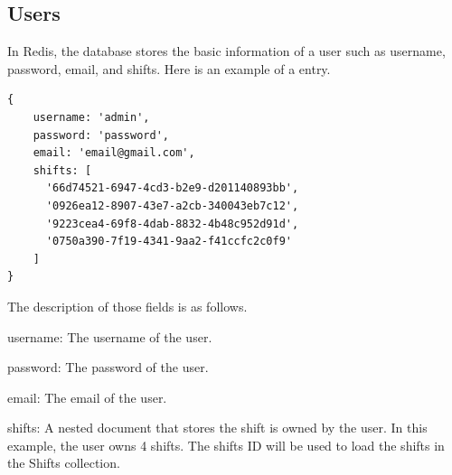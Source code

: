 \documentclass[11pt, oneside]{article}   	%
\begin{document}
\subsection{Users}
In Redis, the database stores the basic information of a user such as username, password, email, and shifts. Here is an example of a entry. 

\begin{verbatim}
{
    username: 'admin',
    password: 'password',
    email: 'email@gmail.com',
    shifts: [
      '66d74521-6947-4cd3-b2e9-d201140893bb',
      '0926ea12-8907-43e7-a2cb-340043eb7c12',
      '9223cea4-69f8-4dab-8832-4b48c952d91d',
      '0750a390-7f19-4341-9aa2-f41ccfc2c0f9'
    ]
}

\end{verbatim}
The description of those fields is as follows.
\begin{compactenum}[1.]
\item username: The username of the user.
\item password: The password of the user.
\item email: The email of the user.
\item shifts: A nested document that stores the shift is owned by the user. In this example, the user owns 4 shifts. The shifts ID will be used to load the shifts in the Shifts collection.
\end{compactenum}
\end{document}
